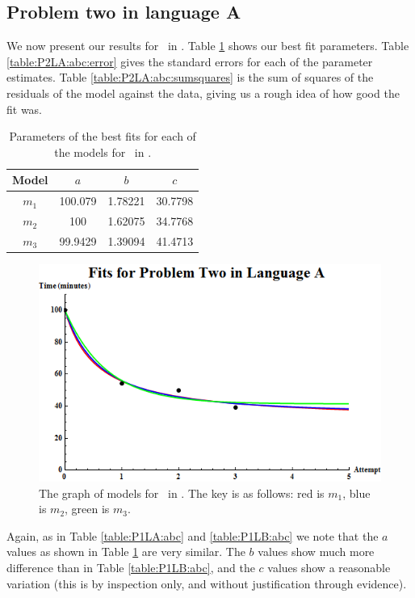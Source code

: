 \subsection{Problem two in language A} \label{subsecP2LA}

We now present our results for \PO\ in \LB.
Table \ref{table:P2LA:abc} shows our best fit parameters.
Table \ref{table:P2LA:abc:error} gives the standard errors for each of the
parameter estimates.
Table \ref{table:P2LA:abc:sumsquares} is the sum of squares of the residuals of
the model against the data, giving us a rough idea of how good the fit was.

\begin{table}[ht!]
\centering
\begin{tabular}{|c|c|c|c|}
\hline
{\bf Model} &  $a$ & $b$ & $c$ \\
\hline
$m_1$ & 100.079 & 1.78221 & 30.7798 \\
\hline
$m_2$ & 100 & 1.62075 & 34.7768\\
\hline
$m_3$ & 99.9429 & 1.39094 & 41.4713 \\
\hline
\end{tabular}
\caption{Parameters of the best fits for each of the models for \PT\ in \LA.}
\label{table:P2LA:abc}
\end{table}

\begin{figure}[ht!]
\centering
\includegraphics[scale=0.65]{./media/P2LAGraph.png}
\caption{The graph of models for \PT\ in \LA. The key is as follows:
		 red is $m_1$,
		 blue is $m_2$,
		 green is $m_3$.
}
	\label{figure:P2LA:abc}
\end{figure}

Again, as in Table \ref{table:P1LA:abc} and \ref{table:P1LB:abc} we note that
the $a$ values as shown in Table \ref{table:P2LA:abc} are very similar.
The $b$ values show much more difference than in Table \ref{table:P1LB:abc}, and
the $c$ values show a reasonable variation (this is by inspection only, and
without justification through evidence).

